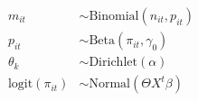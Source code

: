 \documentclass[preview]{standalone}
\begin{document}
\begin{align}
  m_{it} &\sim \mathrm{Binomial}(n_{it}, p_{it})
  \\ p_{it} &\sim \mathrm{Beta}(\pi_{it}, \gamma_{0})
  \\ \theta_k &\sim \mathrm{Dirichlet}(\alpha)
  \\ \mathrm{logit}(\pi_{it}) &\sim \mathrm{Normal}(\Theta X^t\beta)
\end{align}
\end{document}
